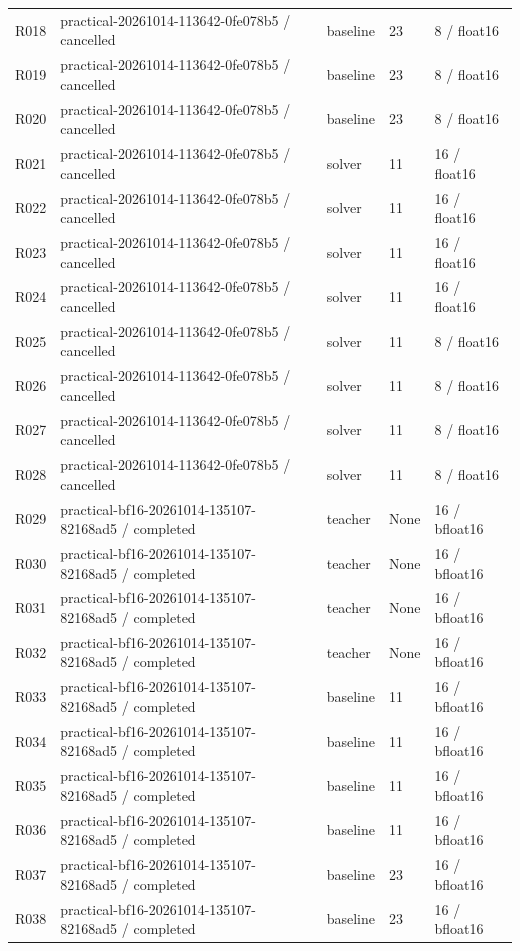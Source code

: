\documentclass[10pt]{article}
\begin{document}
{\begin{longtable}{p{}p{}p{}p{}p{}}
R018 & practical-20261014-113642-0fe078b5 / cancelled & baseline & 23 & 8 / float16 \\
R019 & practical-20261014-113642-0fe078b5 / cancelled & baseline & 23 & 8 / float16 \\
R020 & practical-20261014-113642-0fe078b5 / cancelled & baseline & 23 & 8 / float16 \\
R021 & practical-20261014-113642-0fe078b5 / cancelled & solver & 11 & 16 / float16 \\
R022 & practical-20261014-113642-0fe078b5 / cancelled & solver & 11 & 16 / float16 \\
R023 & practical-20261014-113642-0fe078b5 / cancelled & solver & 11 & 16 / float16 \\
R024 & practical-20261014-113642-0fe078b5 / cancelled & solver & 11 & 16 / float16 \\
R025 & practical-20261014-113642-0fe078b5 / cancelled & solver & 11 & 8 / float16 \\
R026 & practical-20261014-113642-0fe078b5 / cancelled & solver & 11 & 8 / float16 \\
R027 & practical-20261014-113642-0fe078b5 / cancelled & solver & 11 & 8 / float16 \\
R028 & practical-20261014-113642-0fe078b5 / cancelled & solver & 11 & 8 / float16 \\
R029 & practical-bf16-20261014-135107-82168ad5 / completed & teacher & None & 16 / bfloat16 \\
R030 & practical-bf16-20261014-135107-82168ad5 / completed & teacher & None & 16 / bfloat16 \\
R031 & practical-bf16-20261014-135107-82168ad5 / completed & teacher & None & 16 / bfloat16 \\
R032 & practical-bf16-20261014-135107-82168ad5 / completed & teacher & None & 16 / bfloat16 \\
R033 & practical-bf16-20261014-135107-82168ad5 / completed & baseline & 11 & 16 / bfloat16 \\
R034 & practical-bf16-20261014-135107-82168ad5 / completed & baseline & 11 & 16 / bfloat16 \\
R035 & practical-bf16-20261014-135107-82168ad5 / completed & baseline & 11 & 16 / bfloat16 \\
R036 & practical-bf16-20261014-135107-82168ad5 / completed & baseline & 11 & 16 / bfloat16 \\
R037 & practical-bf16-20261014-135107-82168ad5 / completed & baseline & 23 & 16 / bfloat16 \\
R038 & practical-bf16-20261014-135107-82168ad5 / completed & baseline & 23 & 16 / bfloat16 \\

\end{longtable}}
\end{document}
